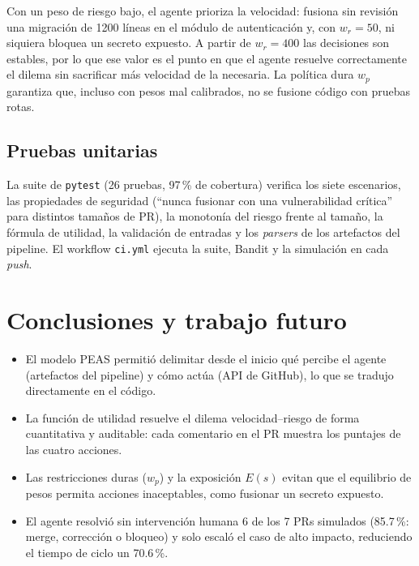 \documentclass[11pt,a4paper]{article}
\begin{document}
Con un peso de riesgo bajo, el agente prioriza la velocidad: fusiona sin revisión una migración de
1200 líneas en el módulo de autenticación y, con $w_r=50$, ni siquiera bloquea un secreto expuesto.
A partir de $w_r=400$ las decisiones son estables, por lo que ese valor es el punto en que el agente
resuelve correctamente el dilema sin sacrificar más velocidad de la necesaria. La política dura $w_p$
garantiza que, incluso con pesos mal calibrados, no se fusione código con pruebas rotas.

\subsection{Pruebas unitarias}

La suite de \texttt{pytest} (26 pruebas, 97\,\% de cobertura) verifica los siete escenarios, las
propiedades de seguridad (``nunca fusionar con una vulnerabilidad crítica'' para distintos tamaños de
PR), la monotonía del riesgo frente al tamaño, la fórmula de utilidad, la validación de entradas y
los \textit{parsers} de los artefactos del pipeline. El workflow \texttt{ci.yml} ejecuta la suite, Bandit
y la simulación en cada \textit{push}.

\section{Conclusiones y trabajo futuro}
\label{sec:conclusiones}

\begin{itemize}[leftmargin=*]
\item El modelo PEAS permitió delimitar desde el inicio qué percibe el agente (artefactos del
      pipeline) y cómo actúa (API de GitHub), lo que se tradujo directamente en el código.
\item La función de utilidad resuelve el dilema velocidad--riesgo de forma cuantitativa y auditable:
      cada comentario en el PR muestra los puntajes de las cuatro acciones.
\item Las restricciones duras ($w_p$) y la exposición $E(s)$ evitan que el equilibrio de pesos
      permita acciones inaceptables, como fusionar un secreto expuesto.
\item El agente resolvió sin intervención humana 6 de los 7 PRs simulados (85.7\,\%: merge,
      corrección o bloqueo) y solo escaló el caso de alto impacto, reduciendo el tiempo de ciclo un 70.6\,\%.
\end{itemize}
\end{document}
